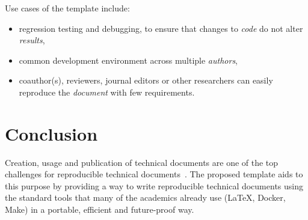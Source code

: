 \documentclass[journal]{IEEEtran}
\begin{document}
Use cases of the template include:
\begin{itemize}
	\item regression testing and debugging, to ensure that changes to \textit{code} do not alter \textit{results},
	\item common development environment across multiple \textit{authors},
	\item coauthor(s), reviewers, journal editors or other researchers can easily reproduce the \textit{document} with few requirements.
\end{itemize}

\section{Conclusion}
Creation, usage and publication of technical documents are one of the top challenges for reproducible technical documents~\cite{barba2019praxis}.
The proposed template aids to this purpose by providing a way to write reproducible technical documents using the standard tools that many of the academics already use (\LaTeX, Docker, Make) in a portable, efficient and future-proof way.



\end{document}
